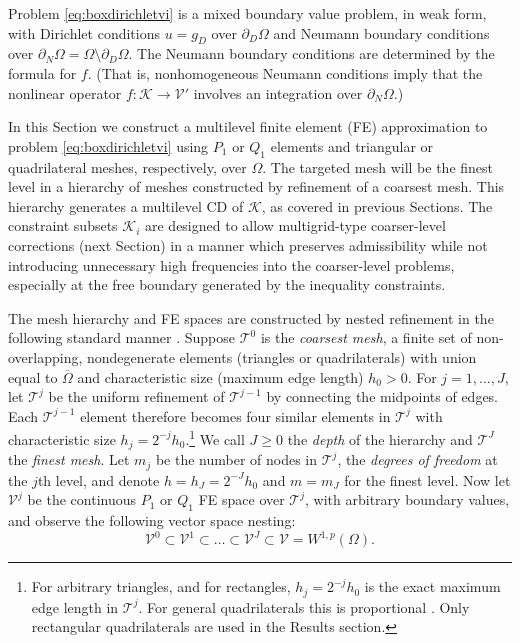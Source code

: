 \documentclass[letterpaper,final,12pt,reqno]{amsart}
\theoremstyle{cstyle}
\theoremstyle{cstyle*}
\theoremstyle{dstyle}
\numberwithin{equation}{section}
\numberwithin{figure}{section}
\numberwithin{table}{section}
\numberwithin{theorem}{section}
\newcommand{\cK}{\mathcal{K}}
\newcommand{\cV}{\mathcal{V}}
\begin{document}
Problem \eqref{eq:boxdirichletvi} is a mixed boundary value problem, in weak form, with Dirichlet conditions $u=g_D$ over $\partial_D\Omega$ and Neumann boundary conditions over $\partial_N \Omega = \Omega \setminus \partial_D \Omega$.  The Neumann boundary conditions are determined by the formula for $f$.  (That is, nonhomogeneous Neumann conditions imply that the nonlinear operator $f:\cK\to\cV'$ involves an integration over $\partial_N\Omega$.)

In this Section we construct a multilevel finite element (FE) approximation to problem \eqref{eq:boxdirichletvi} using $P_1$ or $Q_1$ elements \cite{Elmanetal2014} and triangular or quadrilateral meshes, respectively, over $\Omega$.  The targeted mesh will be the finest level in a hierarchy of meshes constructed by refinement of a coarsest mesh.   This hierarchy generates a multilevel CD of $\cK$, as covered in previous Sections.  The constraint subsets $\cK_i$  are designed to allow multigrid-type coarser-level corrections (next Section) in a manner which preserves admissibility while not introducing unnecessary high frequencies into the coarser-level problems, especially at the free boundary generated by the inequality constraints.

The mesh hierarchy and FE spaces are constructed by nested refinement in the following standard manner \cite{Elmanetal2014}.  Suppose $\mathcal{T}^0$ is the \emph{coarsest mesh}, a finite set of non-overlapping, nondegenerate elements (triangles or quadrilaterals) with union equal to $\overline{\Omega}$ and characteristic size (maximum edge length) $h_0>0$.  For $j=1,\dots,J$, let $\mathcal{T}^j$ be the uniform refinement of $\mathcal{T}^{j-1}$ by connecting the midpoints of edges.  Each $\mathcal{T}^{j-1}$ element therefore becomes four similar elements in $\mathcal{T}^j$ with characteristic size $h_j = 2^{-j} h_0$.\footnote{For arbitrary triangles, and for rectangles, $h_j=2^{-j}h_0$ is the exact maximum edge length in $\mathcal{T}^j$.  For general quadrilaterals this is proportional \cite{Zhang2004}.  Only rectangular quadrilaterals are used in the Results section.}  We call $J\ge 0$ the \emph{depth} of the hierarchy and $\mathcal{T}^J$ the \emph{finest mesh}.  Let $m_j$ be the number of nodes in $\mathcal{T}^j$, the \emph{degrees of freedom} at the $j$th level, and denote $h=h_J=2^{-J} h_0$ and $m=m_J$ for the finest level.  Now let $\mathcal{V}^j$ be the continuous $P_1$ or $Q_1$ FE space \cite{Elmanetal2014} over $\mathcal{T}^j$, with arbitrary boundary values, and observe the following vector space nesting:
\begin{equation}
\mathcal{V}^0 \subset \mathcal{V}^1 \subset \dots \subset \mathcal{V}^J \subset \mathcal{V}=W^{1,p}(\Omega).  \label{eq:fe:nestedspaces}
\end{equation}
\end{document}
